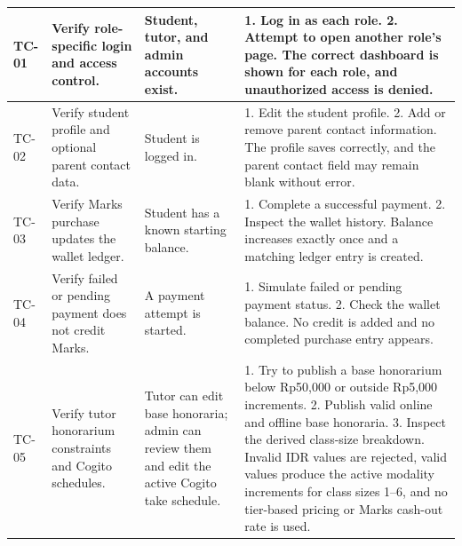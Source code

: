 \documentclass[11pt,a4paper]{article}
\begin{document}
\begin{longtable}{|L{1.2cm}|L{3.3cm}|L{3.9cm}|L{6.0cm}|}
	TC-01          & Verify role-specific login and access control.                       & Student, tutor, and admin accounts exist.                              & 1. Log in as each role. 2. Attempt to open another role's page. \newline The correct dashboard is shown for each role, and unauthorized access is denied.                                                                                                                                                       \\
	\hline
	TC-02          & Verify student profile and optional parent contact data.             & Student is logged in.                                                  & 1. Edit the student profile. 2. Add or remove parent contact information. \newline The profile saves correctly, and the parent contact field may remain blank without error.                                                                                                                                    \\
	\hline
	TC-03          & Verify Marks purchase updates the wallet ledger.                     & Student has a known starting balance.                                  & 1. Complete a successful payment. 2. Inspect the wallet history. \newline Balance increases exactly once and a matching ledger entry is created.                                                                                                                                                                \\
	\hline
	TC-04          & Verify failed or pending payment does not credit Marks.              & A payment attempt is started.                                          & 1. Simulate failed or pending payment status. 2. Check the wallet balance. \newline No credit is added and no completed purchase entry appears.                                                                                                                                                                 \\
	\hline
	TC-05          & Verify tutor honorarium constraints and Cogito schedules.                      & Tutor can edit base honoraria; admin can review them and edit the active Cogito take schedule.                                    & 1. Try to publish a base honorarium below Rp50,000 or outside Rp5,000 increments. 2. Publish valid online and offline base honoraria. 3. Inspect the derived class-size breakdown. \newline Invalid IDR values are rejected, valid values produce the active modality increments for class sizes 1--6, and no tier-based pricing or Marks cash-out rate is used.                                                                                                                                                                       \\

\end{longtable}
\end{document}
